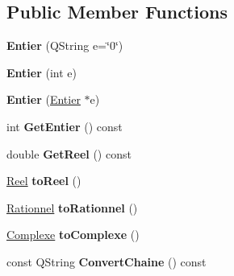 \subsection*{Public Member Functions}
\begin{DoxyCompactItemize}
\item 
\hypertarget{class_calcul_1_1_entier_aa95e3fe95acf3f49833246dea376e020}{{\bfseries Entier} (Q\-String e=\char`\"{}0\char`\"{})}\label{class_calcul_1_1_entier_aa95e3fe95acf3f49833246dea376e020}

\item 
\hypertarget{class_calcul_1_1_entier_afbaaaf29663668771b65630b394f5224}{{\bfseries Entier} (int e)}\label{class_calcul_1_1_entier_afbaaaf29663668771b65630b394f5224}

\item 
\hypertarget{class_calcul_1_1_entier_a5c76d9b068af9beaf3bc792d45020303}{{\bfseries Entier} (\hyperlink{class_calcul_1_1_entier}{Entier} $\ast$e)}\label{class_calcul_1_1_entier_a5c76d9b068af9beaf3bc792d45020303}

\item 
\hypertarget{class_calcul_1_1_entier_a2c99d3c3f8ec5346b94e3466b940cf99}{int {\bfseries Get\-Entier} () const }\label{class_calcul_1_1_entier_a2c99d3c3f8ec5346b94e3466b940cf99}

\item 
\hypertarget{class_calcul_1_1_entier_a7b917c5e0a8ae9278cf0ee0092ba608c}{double {\bfseries Get\-Reel} () const }\label{class_calcul_1_1_entier_a7b917c5e0a8ae9278cf0ee0092ba608c}

\item 
\hypertarget{class_calcul_1_1_entier_a3dd4de5f5c21961124d2a57613b7009d}{\hyperlink{class_calcul_1_1_reel}{Reel} {\bfseries to\-Reel} ()}\label{class_calcul_1_1_entier_a3dd4de5f5c21961124d2a57613b7009d}

\item 
\hypertarget{class_calcul_1_1_entier_a5797bcf92c69da8d07ce6f1c509a3dbe}{\hyperlink{class_calcul_1_1_rationnel}{Rationnel} {\bfseries to\-Rationnel} ()}\label{class_calcul_1_1_entier_a5797bcf92c69da8d07ce6f1c509a3dbe}

\item 
\hypertarget{class_calcul_1_1_entier_a7d0bcf436ce6517b8738f79eadda1f8a}{\hyperlink{class_calcul_1_1_complexe}{Complexe} {\bfseries to\-Complexe} ()}\label{class_calcul_1_1_entier_a7d0bcf436ce6517b8738f79eadda1f8a}

\item 
\hypertarget{class_calcul_1_1_entier_ae8e0b25ab85569d478cce96f02d31959}{const Q\-String {\bfseries Convert\-Chaine} () const }\label{class_calcul_1_1_entier_ae8e0b25ab85569d478cce96f02d31959}


\end{DoxyCompactItemize}
